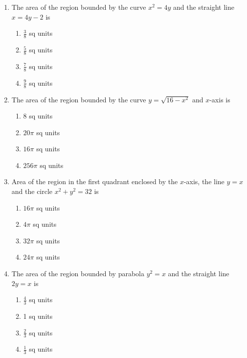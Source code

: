 \begin{enumerate}[label=\thesection.\arabic*,ref=\thesection.\theenumi]
\item The area of the region bounded by the curve $x^2 = 4y$ and the straight line $x = 4y - 2$ is
\begin{enumerate}
\item $\frac{3}{8}$ sq units 
\item $\frac{5}{8}$ sq units
\item $\frac{7}{8}$ sq units 
\item $\frac{9}{8}$ sq units
\end{enumerate}
\item The area of the region bounded by the curve $y = \sqrt{16 - x^2}$ and $x$-axis is 
\begin{enumerate}
\item 8 sq units 
\item ${20\pi}$ sq units
\item ${16\pi}$ sq units
\item ${256\pi}$ sq units
\end{enumerate}
\item Area of the region in the first quadrant enclosed by the $x$-axis, the line $y = x$ and the circle $x^2 + y^2 = 32$ is 
\begin{enumerate}
\item ${16\pi}$ sq units 
\item ${4\pi}$ sq units
\item ${32\pi}$ sq units
\item ${24\pi}$ sq units
\end{enumerate}
\item The area of the region bounded by parabola $y^2 = x$ and the straight line $2y = x$ is
\begin{enumerate}
\item $\frac{4}{3}$ sq units
\item 1 sq units
\item $\frac{2}{3}$ sq units 
\item $\frac{1}{3}$ sq units
\end{enumerate}
\end{enumerate}
